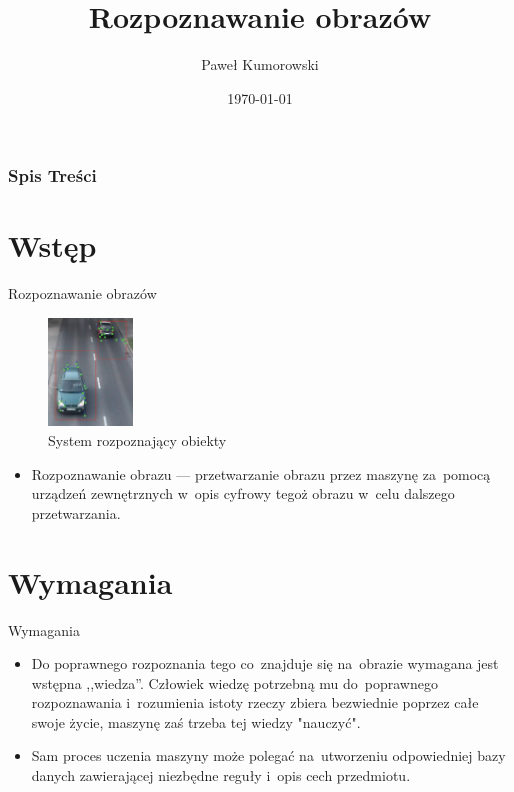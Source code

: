 \documentclass{beamer}
\title{Rozpoznawanie obrazów}
\author{Paweł Kumorowski}
\date{\today}
\begin{document}
\frame{\titlepage}


\begin{frame}
\frametitle{Spis Treści}
\tableofcontents
\end{frame}


\section{Wstęp}
\begin{frame}{Rozpoznawanie obrazów}

\begin{figure}
	\centering
		\includegraphics[width=0.2\textwidth]{samochod.jpg}
		\caption{System rozpoznający obiekty}
\end{figure}

\begin{itemize}
\item Rozpoznawanie obrazu --- przetwarzanie obrazu przez maszynę za~pomocą urządzeń zewnętrznych w~opis cyfrowy tegoż obrazu w~celu dalszego przetwarzania.
\end{itemize}
\end{frame}


\section{Wymagania}
\begin{frame}{Wymagania}
\begin{itemize}
\item Do poprawnego rozpoznania tego co~znajduje się na~obrazie wymagana jest wstępna ,,wiedza''. Człowiek wiedzę potrzebną mu do~poprawnego rozpoznawania i~rozumienia istoty rzeczy zbiera bezwiednie poprzez całe swoje życie, maszynę zaś trzeba tej wiedzy "nauczyć".
\pause
\item Sam proces uczenia maszyny może polegać na~utworzeniu odpowiedniej bazy danych zawierającej niezbędne reguły i~opis cech przedmiotu.
\end{itemize}
\end{frame}
\end{document}
